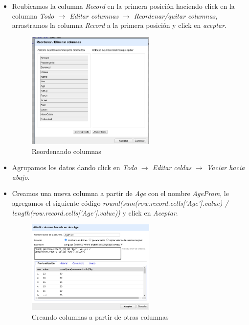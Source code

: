 \documentclass[12pt]{article}
\begin{document}
\begin{itemize}
                    \item Reubicamos la columna \textit{Record} en la primera posición haciendo click en la columna \textit{Todo $\rightarrow$ Editar columnas $\rightarrow$ Reordenar/quitar columnas}, arrastramos la columna \textit{Record} a la primera posición y click en \textit{aceptar}.
                        \newpage
                        \begin{figure}[!h]
                            \centering
                            \includegraphics[width=0.6\textwidth]{img/openrefine-17.png}
                            \caption{Reordenando columnas}
                        \end{figure}
                    
                    \item Agrupamos los datos dando click en \textit{Todo $\rightarrow$  Editar celdas $\rightarrow$  Vaciar hacia abajo}.
                    \item Creamos una nueva columna a partir de \textit{Age} con el nombre \textit{AgeProm}, le agregamos el siguiente código \textit{round(sum(row.record.cells['Age'].value) / length(row.record.cells['Age'].value))} y click en \textit{Aceptar}.
                        \begin{figure}[!h]
                            \centering
                            \includegraphics[width=0.6\textwidth]{img/openrefine-18.png}
                            \caption{Creando columnas a partir de otras columnas}
                        \end{figure}
                    

\end{itemize}
\end{document}
